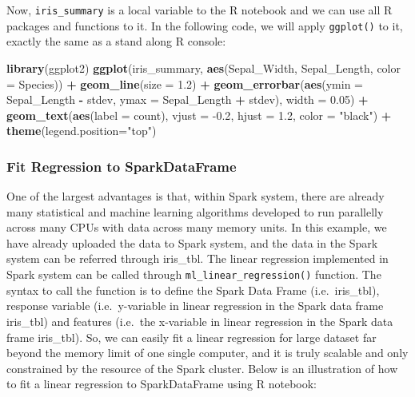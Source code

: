 \documentclass[
]{article}
\newenvironment{Shaded}{\begin{snugshade}}{\end{snugshade}}
\newcommand{\DataTypeTok}[1]{\textcolor[rgb]{0.13,0.29,0.53}{#1}}
\newcommand{\FloatTok}[1]{\textcolor[rgb]{0.00,0.00,0.81}{#1}}
\newcommand{\KeywordTok}[1]{\textcolor[rgb]{0.13,0.29,0.53}{\textbf{#1}}}
\newcommand{\NormalTok}[1]{#1}
\newcommand{\OperatorTok}[1]{\textcolor[rgb]{0.81,0.36,0.00}{\textbf{#1}}}
\newcommand{\StringTok}[1]{\textcolor[rgb]{0.31,0.60,0.02}{#1}}
\begin{document}
Now, \texttt{iris\_summary} is a local variable to the R notebook and we
can use all R packages and functions to it. In the following code, we
will apply \texttt{ggplot()} to it, exactly the same as a stand along R
console:

\begin{Shaded}
\begin{Highlighting}[]
\KeywordTok{library}\NormalTok{(ggplot2)}
\KeywordTok{ggplot}\NormalTok{(iris_summary, }\KeywordTok{aes}\NormalTok{(Sepal_Width, Sepal_Length, }\DataTypeTok{color =}\NormalTok{ Species)) }\OperatorTok{+}\StringTok{ }
\StringTok{  }\KeywordTok{geom_line}\NormalTok{(}\DataTypeTok{size =} \FloatTok{1.2}\NormalTok{) }\OperatorTok{+}
\StringTok{  }\KeywordTok{geom_errorbar}\NormalTok{(}\KeywordTok{aes}\NormalTok{(}\DataTypeTok{ymin =}\NormalTok{ Sepal_Length }\OperatorTok{-}\StringTok{ }\NormalTok{stdev, }\DataTypeTok{ymax =}\NormalTok{ Sepal_Length }\OperatorTok{+}\StringTok{ }\NormalTok{stdev), }\DataTypeTok{width =} \FloatTok{0.05}\NormalTok{) }\OperatorTok{+}
\StringTok{  }\KeywordTok{geom_text}\NormalTok{(}\KeywordTok{aes}\NormalTok{(}\DataTypeTok{label =}\NormalTok{ count), }\DataTypeTok{vjust =} \FloatTok{-0.2}\NormalTok{, }\DataTypeTok{hjust =} \FloatTok{1.2}\NormalTok{, }\DataTypeTok{color =} \StringTok{"black"}\NormalTok{) }\OperatorTok{+}
\StringTok{  }\KeywordTok{theme}\NormalTok{(}\DataTypeTok{legend.position=}\StringTok{"top"}\NormalTok{)}
\end{Highlighting}
\end{Shaded}

\hypertarget{fit-regression-to-sparkdataframe}{%
\subsubsection{Fit Regression to
SparkDataFrame}\label{fit-regression-to-sparkdataframe}}

One of the largest advantages is that, within Spark system, there are
already many statistical and machine learning algorithms developed to
run parallelly across many CPUs with data across many memory units. In
this example, we have already uploaded the data to Spark system, and the
data in the Spark system can be referred through iris\_tbl. The linear
regression implemented in Spark system can be called through
\texttt{ml\_linear\_regression()} function. The syntax to call the
function is to define the Spark Data Frame (i.e.~iris\_tbl), response
variable (i.e.~y-variable in linear regression in the Spark data frame
iris\_tbl) and features (i.e.~the x-variable in linear regression in the
Spark data frame iris\_tbl). So, we can easily fit a linear regression
for large dataset far beyond the memory limit of one single computer,
and it is truly scalable and only constrained by the resource of the
Spark cluster. Below is an illustration of how to fit a linear
regression to SparkDataFrame using R notebook:
\end{document}
